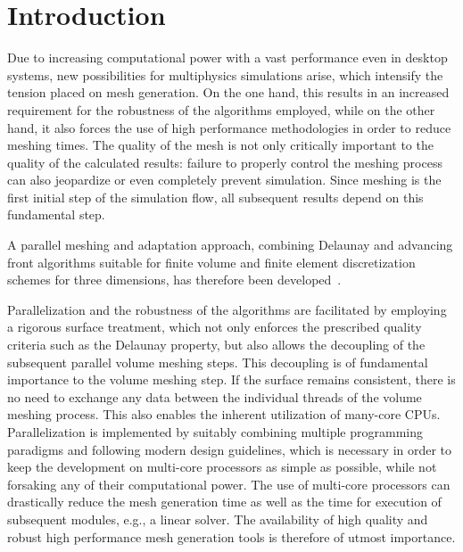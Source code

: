 
\section{Introduction}  %

Due to increasing computational power with a vast performance even in desktop systems, new possibilities for multiphysics simulations arise, which intensify the tension placed on mesh generation. On the one hand, this results in an increased requirement for the robustness of the algorithms employed, while on the other hand, it also forces the use of high performance methodologies in order to reduce meshing times. 
The quality of the mesh is not only critically important to the quality of the calculated results: failure to properly control the meshing process can also jeopardize or even completely prevent simulation. Since meshing is the first initial step of the simulation flow, all subsequent results depend on this fundamental step. 

A parallel meshing and adaptation approach, combining Delaunay and advancing front algorithms suitable for finite volume and finite element discretization schemes for three dimensions, has therefore been developed~\cite{stimpflrobust,stimpflperf,stimpflmulti,heinzlgen}. 

Parallelization and the robustness of the algorithms are facilitated by employing a rigorous surface treatment, which not only enforces the prescribed quality criteria such as the Delaunay property, but also allows the decoupling of the subsequent parallel volume meshing steps. This decoupling is of fundamental importance to the volume meshing step. If the surface remains consistent, there is no need to exchange any data between the individual threads of the volume meshing process. This also enables the inherent utilization of many-core CPUs. Parallelization is implemented by suitably combining multiple programming paradigms and following modern design guidelines, which is necessary in order to keep the development on multi-core processors as simple as possible, while not forsaking any of their computational power. 
The use of multi-core processors can drastically reduce the mesh generation time as well as the time for execution of subsequent modules, e.g., a linear solver. The availability of high quality and robust high performance mesh generation tools is therefore of utmost importance.



